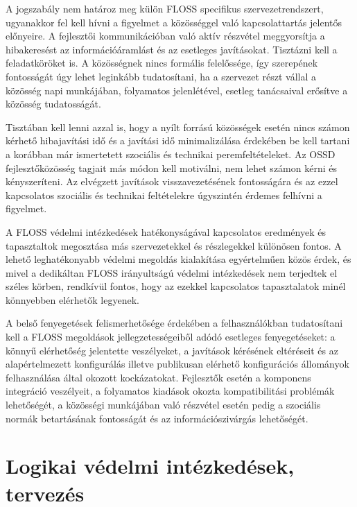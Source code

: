 \documentclass[12pt,magyar,a4paper,oneside]{scrreprt}
\begin{document}
A jogszabály nem határoz meg külön FLOSS specifikus szervezetrendszert,
ugyanakkor fel kell hívni a figyelmet a közösséggel való kapcsolattartás
jelentős előnyeire. A fejlesztői kommunikációban való aktív részvétel
meggyorsítja a hibakeresést az információáramlást és az esetleges
javításokat. Tisztázni kell a feladatköröket is. A közösségnek nincs
formális felelőssége, így szerepének fontosságát úgy lehet leginkább
tudatosítani, ha a szervezet részt vállal a közösség napi munkájában,
folyamatos jelenlétével, esetleg tanácsaival erősítve a közösség
tudatosságát.

Tisztában kell lenni azzal is, hogy a nyílt forrású közösségek esetén
nincs számon kérhető hibajavítási idő és a javítási idő minimalizálása
érdekében be kell tartani a korábban már ismertetett szociális és
technikai peremfeltételeket. Az OSSD fejlesztőközösség tagjait más módon
kell motiválni, nem lehet számon kérni és kényszeríteni. Az elvégzett
javítások visszavezetésének fontosságára és az ezzel kapcsolatos
szociális és technikai feltételekre úgyszintén érdemes felhívni a
figyelmet.

A FLOSS védelmi intézkedések hatékonyságával kapcsolatos eredmények és
tapasztaltok megosztása más szervezetekkel és részlegekkel különösen
fontos. A lehető leghatékonyabb védelmi megoldás kialakítása
egyértelműen közös érdek, és mivel a dedikáltan FLOSS irányultságú
védelmi intézkedések nem terjedtek el széles körben, rendkívül fontos,
hogy az ezekkel kapcsolatos tapasztalatok minél könnyebben elérhetők
legyenek.

A belső fenyegetések felismerhetősége érdekében a felhasználókban
tudatosítani kell a FLOSS megoldások jellegzetességeiből adódó esetleges
fenyegetéseket: a könnyű elérhetőség jelentette veszélyeket, a javítások
kérésének eltéréseit és az alapértelmezett konfigurálás illetve
publikusan elérhető konfigurációs állományok felhasználása által okozott
kockázatokat. Fejlesztők esetén a komponens integráció veszélyeit, a
folyamatos kiadások okozta kompatibilitási problémák lehetőségét, a
közösségi munkájában való részvétel esetén pedig a szociális normák
betartásának fontosságát és az információszivárgás lehetőségét.

\hypertarget{logikai-vuxe9delmi-intuxe9zkeduxe9sek-tervezuxe9s}{%
\section{Logikai védelmi intézkedések,
tervezés}\label{logikai-vuxe9delmi-intuxe9zkeduxe9sek-tervezuxe9s}}
\end{document}
